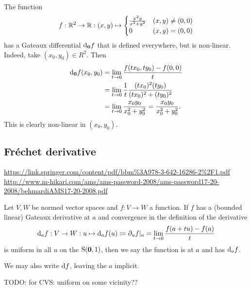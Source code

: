 \begin{example}
The function
\[ f: \mathbb{R}^2\to \mathbb{R}: (x,y) \mapsto \begin{cases}
\frac{x^2y}{x^2+y^2} & (x,y)\neq (0,0) \\0 & (x,y) = (0,0)
\end{cases} \]
has a Gateaux differential $\operatorname{d \!}{_{\boldsymbol{\mathrm{0}}}f}$ that is defined everywhere, but is non-linear.
Indeed, take $(x_0, y_0)\in R^2$. Then
\begin{align*}
\operatorname{d \!}{_{\boldsymbol{\mathrm{0}}}f}(x_0, y_0) &= \lim_{t\to 0}\frac{f(tx_0, ty_0) - f(0,0)}{t} \\
&= \lim_{t\to 0}\frac{1}{t}\frac{(tx_0)^2(ty_0)}{(tx_0)^2+(ty_0)^2} \\
&= \lim_{t\to 0}\frac{x_0y_0}{x_0^2+y_0^2} = \frac{x_0y_0}{x_0^2+y_0^2}.
\end{align*}
This is clearly non-linear in $(x_0, y_0)$.
\end{example}


\subsection{Fréchet derivative}
\url{https://link.springer.com/content/pdf/bbm%3A978-3-642-16286-2%2F1.pdf}
\url{http://www.m-hikari.com/ams/ams-password-2008/ams-password17-20-2008/behmardiAMS17-20-2008.pdf}

\begin{definition}
Let $V,W$ be normed vector spaces and $f: V\to W$ a function.
If $f$ has a (bounded linear) Gateaux derivative at $a$ and convergence in the definition of the derivative
\[ \operatorname{d \!}{_af}: V\to W: u\mapsto \operatorname{d \!}{_af}(u) \coloneqq \partial_u f|_a = \lim_{t\to 0} \frac{f(a+tu) - f(a)}{t} \]
is uniform in all $u$ on the $\operatorname{S}(\boldsymbol{\mathrm{0}},1)$, then we say the function is  at $a$ and has  $\operatorname{d \!}{_af}$.

We may also write $\operatorname{d \!}{f}$, leaving the $a$ implicit.
\end{definition}
TODO: for CVS: uniform on some vicinity??

